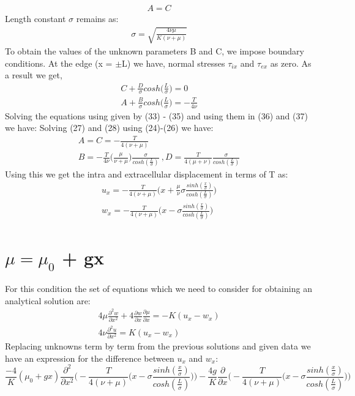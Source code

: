 \documentclass[a4paper,oneside,11pt]{report}
\begin{document}
\begin{align}
A = C
\end{align}
Length constant $\sigma$ remains as: 
\begin{align}
	\sigma = \sqrt{\frac{4\nu\mu}{K(\nu + \mu)}}
\end{align}
To obtain the values of the unknown parameters B and C, we impose boundary conditions. At the edge (x = $\pm$L) we have, normal stresses $\tau_{ix}$ and $\tau_{ex}$ as zero. As a result we get,
\begin{align}
C + \frac{D}{\sigma}cosh\Big ( \frac{L}{\sigma} \Big ) = 0\\
A + \frac{B}{\sigma}cosh\Big ( \frac{L}{\sigma} \Big ) = -\frac{T}{4\nu}
\end{align}
Solving the equations using given by (33) - (35) and using them in (36) and (37) we have: 
Solving (27) and (28) using (24)-(26) we have:
\begin{align}
A = C = -\frac{T}{4(\nu + \mu)}\\
B = -\frac{T}{4\nu}\Big ( \frac{\mu}{\nu + \mu} \Big )\frac{\sigma}{cosh(\frac{L}{\sigma})}\
, D = \frac{T}{4(\mu + \nu)}\frac{\sigma}{cosh(\frac{L}{\sigma})}
\end{align}
Using this we get the intra and extracellular displacement in terms of T as:
\begin{align}
u_x = -\frac{T}{4(\nu + \mu)} \Big ( x + \frac{\mu}{\nu} \sigma \frac{sinh(\frac{x}{\sigma})}{cosh(\frac{L}{\sigma})}\Big )\\
w_x = -\frac{T}{4(\nu + \mu)} \Big ( x - \sigma \frac{sinh(\frac{x}{\sigma})}{cosh(\frac{L}{\sigma})}\Big )
\end{align}
\section*{$\mu = \mu_0$ + gx }
For this condition the set of equations which we need to consider for obtaining an analytical solution are: 
\begin{align}
4\mu\frac{\partial^2 w}{\partial x^2} + 4\frac{\partial w}{\partial x}\frac{\partial \mu}{\partial x} = -K(u_x - w_x) \\
4\nu\frac{\partial^2 u}{\partial x^2} = K(u_x - w_x)
\end{align}
Replacing unknowns term by term from the previous solutions and given data we have an expression for the difference between $u_x$ and $w_x$: 
\[\boxed{\frac{-4}{K}(\mu_0 + gx )\frac{\partial^2}{\partial x^2}\Bigg( -\frac{T}{4(\nu + \mu)} \Big ( x - \sigma \frac{sinh(\frac{x}{\sigma})}{cosh(\frac{L}{\sigma})}\Big )\Bigg) - \frac{4g}{K}\frac{\partial}{\partial x}\Bigg( -\frac{T}{4(\nu + \mu)} \Big ( x - \sigma \frac{sinh(\frac{x}{\sigma})}{cosh(\frac{L}{\sigma})}\Big )\Bigg)}\]
\end{document}
